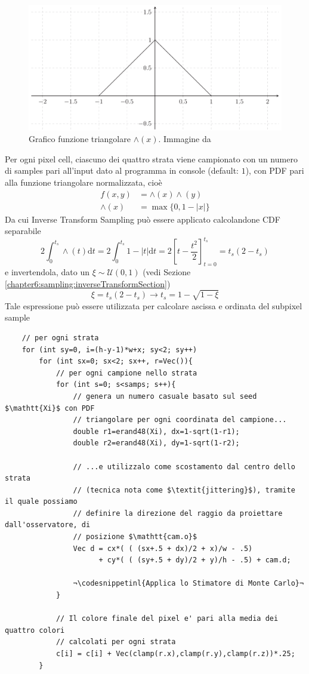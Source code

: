 \begin{figure}[tb]
	\centering
	\includegraphics[width=0.6\linewidth]{../assets/chapter8_triangular_function.png}
	\caption{Grafico funzione triangolare $\wedge(x)$. Immagine da \cite{pegoraro}}
\end{figure}
Per ogni pixel cell, ciascuno dei quattro strata viene campionato con un numero di samples pari all'input dato al programma in console (default: $1$),
con PDF pari alla funzione triangolare normalizzata, cio\`e
\begin{align}
	f(x,y)&=\wedge(x)\wedge(y) \\
	\wedge(x)&=\max\{0,1-|x|\}\nonumber
\end{align}
Da cui Inverse Transform Sampling pu\`o essere applicato calcolandone CDF separabile
\begin{equation}
	2\int_0^{t_s}\wedge(t)\mathrm{d}t=2\int_0^{t_s}1-|t|\mathrm{d}t=2\left[t-\frac{t^2}{2}\right]_{t=0}^{t_s}=t_s(2-t_s)
\end{equation}
e invertendola, dato un $\xi\sim\mathcal{U}(0,1)$ (vedi Sezione \ref{chapter6:sampling:inverseTransformSection})
\begin{equation}
	\xi=t_s(2-t_s)\longrightarrow t_s=1-\sqrt{1-\xi}
\end{equation}
Tale espressione pu\`o essere utilizzata per calcolare ascissa e ordinata del subpixel sample
\begin{verbatim}
	// per ogni strata
	for (int sy=0, i=(h-y-1)*w+x; sy<2; sy++)     
		for (int sx=0; sx<2; sx++, r=Vec()){        
			// per ogni campione nello strata
			for (int s=0; s<samps; s++){ 
				// genera un numero casuale basato sul seed $\mathtt{Xi}$ con PDF 
				// triangolare per ogni coordinata del campione...
				double r1=erand48(Xi), dx=1-sqrt(1-r1); 
				double r2=erand48(Xi), dy=1-sqrt(1-r2); 

				// ...e utilizzalo come scostamento dal centro dello strata 
				// (tecnica nota come $\textit{jittering}$), tramite il quale possiamo
				// definire la direzione del raggio da proiettare dall'osservatore, di 
				// posizione $\mathtt{cam.o}$
				Vec d = cx*( ( (sx+.5 + dx)/2 + x)/w - .5) 
					  + cy*( ( (sy+.5 + dy)/2 + y)/h - .5) + cam.d; 

				¬\codesnippetinl{Applica lo Stimatore di Monte Carlo}¬
			} 

			// Il colore finale del pixel e' pari alla media dei quattro colori 
			// calcolati per ogni strata
			c[i] = c[i] + Vec(clamp(r.x),clamp(r.y),clamp(r.z))*.25; 
		} 
\end{verbatim}
